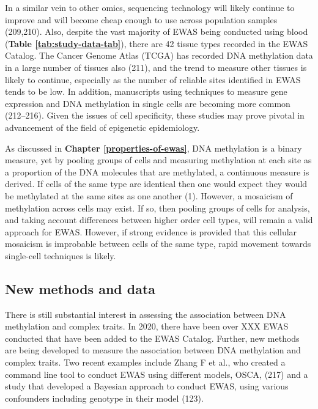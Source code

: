 \documentclass[11pt,oneside]{bristolthesis}
\begin{document}
In a similar vein to other omics, sequencing technology will likely continue to improve and will become cheap enough to use across population samples (209,210). Also, despite the vast majority of EWAS being conducted using blood (\textbf{Table \ref{tab:study-data-tab}}), there are 42 tissue types recorded in the EWAS Catalog. The Cancer Genome Atlas (TCGA) has recorded DNA methylation data in a large number of tissues also (211), and the trend to measure other tissues is likely to continue, especially as the number of reliable sites identified in EWAS tends to be low. In addition, manuscripts using techniques to measure gene expression and DNA methylation in single cells are becoming more common (212--216). Given the issues of cell specificity, these studies may prove pivotal in advancement of the field of epigenetic epidemiology.

As discussed in \textbf{Chapter \ref{properties-of-ewas}}, DNA methylation is a binary measure, yet by pooling groups of cells and measuring methylation at each site as a proportion of the DNA molecules that are methylated, a continuous measure is derived. If cells of the same type are identical then one would expect they would be methylated at the same sites as one another (1). However, a mosaicism of methylation across cells may exist. If so, then pooling groups of cells for analysis, and taking account differences between higher order cell types, will remain a valid approach for EWAS. However, if strong evidence is provided that this cellular mosaicism is improbable between cells of the same type, rapid movement towards single-cell techniques is likely.

\hypertarget{new-methods-and-data}{%
\subsection{New methods and data}\label{new-methods-and-data}}

There is still substantial interest in assessing the association between DNA methylation and complex traits. In 2020, there have been over XXX EWAS conducted that have been added to the EWAS Catalog. Further, new methods are being developed to measure the association between DNA methylation and complex traits. Two recent examples include Zhang F et al., who created a command line tool to conduct EWAS using different models, OSCA, (217) and a study that developed a Bayesian approach to conduct EWAS, using various confounders including genotype in their model (123).
\end{document}
